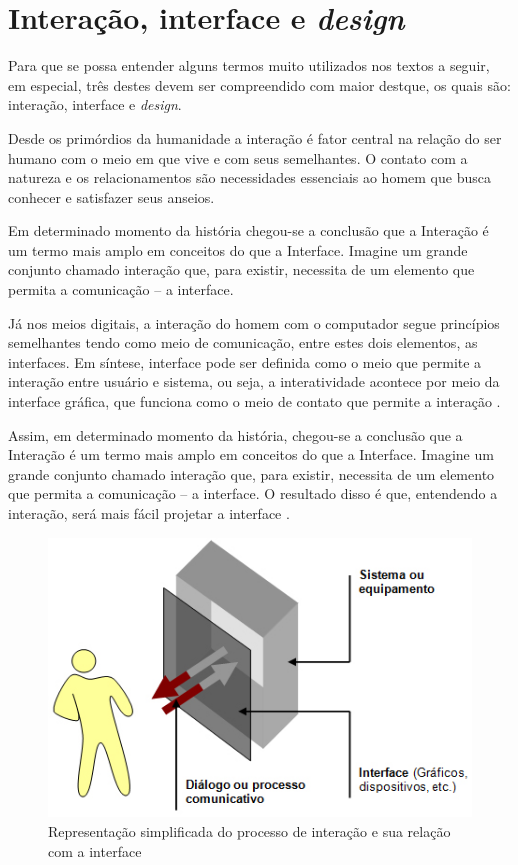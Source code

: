 \section{Interação, interface e \textit{design}} \label{section:interacao-e-interface-e-design}
Para que se possa entender alguns termos muito utilizados nos textos a seguir, em especial, três destes devem ser compreendido com maior destque, os quais são: interação, interface e \textit{design}.

Desde os primórdios da humanidade a interação é fator central na relação do ser humano com o meio em que vive e com seus semelhantes. O contato com a natureza e os relacionamentos são necessidades essenciais ao homem que busca conhecer e satisfazer seus anseios. 

Em determinado momento da história chegou-se a conclusão que a Interação é um termo mais amplo em conceitos do que a Interface. Imagine um grande conjunto chamado interação que, para existir, necessita de um elemento que permita a comunicação – a interface.  

Já nos meios digitais, a interação do homem com o computador segue princípios semelhantes tendo como meio de comunicação, entre estes dois elementos, as interfaces. Em síntese, interface pode ser definida como o meio que permite a interação entre usuário e sistema, ou seja, a interatividade acontece por meio da interface gráfica, que funciona como o meio de contato que permite a interação \cite{lemos2015cibercultura}. 

Assim, em determinado momento da história, chegou-se a conclusão que a Interação é um termo mais amplo em conceitos do que a Interface. Imagine um grande conjunto chamado interação que, para existir, necessita de um elemento que permita a comunicação – a interface. O resultado disso é que, entendendo a interação, será mais fácil projetar a interface \cite{IrlaRebelo}.

\begin{figure}[H]
    \centering
    \includegraphics[scale=0.6]{imagens/interfaceinteracao.jpg}
    \caption{Representação simplificada do processo de interação e sua relação com a interface}
    \label{fig:interface-interacao}
\end{figure}


